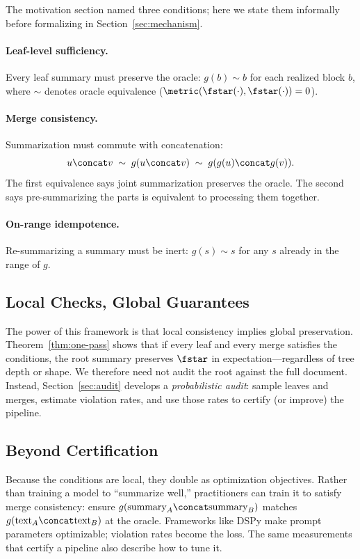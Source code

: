 The motivation section named three conditions; here we state them informally before formalizing in Section~\ref{sec:mechanism}.

\paragraph{Leaf-level sufficiency.}
Every leaf summary must preserve the oracle: $g(b) \sim b$ for each realized block $b$, where $\sim$ denotes oracle equivalence ($\metric(\fstar(\cdot), \fstar(\cdot)) = 0$).

\paragraph{Merge consistency.}
Summarization must commute with concatenation:
\[
u \concat v \;\sim\; g(u \concat v) \;\sim\; g(g(u) \concat g(v)).
\]
The first equivalence says joint summarization preserves the oracle. The second says pre-summarizing the parts is equivalent to processing them together.

\paragraph{On-range idempotence.}
Re-summarizing a summary must be inert: $g(s) \sim s$ for any $s$ already in the range of $g$.

\subsection{Local Checks, Global Guarantees}\label{sec:local-to-global-preview}

The power of this framework is that local consistency implies global preservation. Theorem~\ref{thm:one-pass} shows that if every leaf and every merge satisfies the conditions, the root summary preserves $\fstar$ in expectation---regardless of tree depth or shape. We therefore need not audit the root against the full document. Instead, Section~\ref{sec:audit} develops a \emph{probabilistic audit}: sample leaves and merges, estimate violation rates, and use those rates to certify (or improve) the pipeline.

\subsection{Beyond Certification}\label{sec:beyond-auditing-preview}

Because the conditions are local, they double as optimization objectives. Rather than training a model to ``summarize well,'' practitioners can train it to satisfy merge consistency: ensure $g(\text{summary}_A \concat \text{summary}_B)$ matches $g(\text{text}_A \concat \text{text}_B)$ at the oracle. Frameworks like DSPy \citep{khattab2024dspy} make prompt parameters optimizable; violation rates become the loss. The same measurements that certify a pipeline also describe how to tune it.

